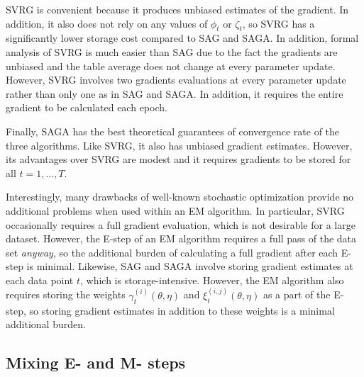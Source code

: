 SVRG is convenient because it produces unbiased estimates of the gradient. In addition, it also does not rely on any values of $\phi_t$ or $\zeta_t$, so SVRG has a significantly lower storage cost compared to SAG and SAGA. In addition, formal analysis of SVRG is much easier than SAG due to the fact the gradients are unbiased and the table average does not change at every parameter update. However, SVRG involves two gradients evaluations at every parameter update rather than only one as in SAG and SAGA. In addition, it requires the entire gradient to be calculated each epoch.

Finally, SAGA has the best theoretical guarantees of convergence rate of the three algorithms. Like SVRG, it also has unbiased gradient estimates. However, its advantages over SVRG are modest and it requires gradients to be stored for all $t = 1,\ldots,T$.

Interestingly, many drawbacks of well-known stochastic optimization provide no additional problems when used within an EM algorithm. In particular, SVRG occasionally requires a full gradient evaluation, which is not desirable for a large dataset. However, the E-step of an EM algorithm requires a full pass of the data set \textit{anyway}, so the additional burden of calculating a full gradient after each E-step is minimal. Likewise, SAG and SAGA involve storing gradient estimates at each data point $t$, which is storage-intensive. However, the EM algorithm also requires storing the weights $\gamma_t^{(i)}(\theta, \eta)$ and $\xi_t^{(i,j)}(\theta, \eta)$ as a part of the E-step, so storing gradient estimates in addition to these weights is a minimal additional burden.



\subsection{Mixing E- and M- steps}

